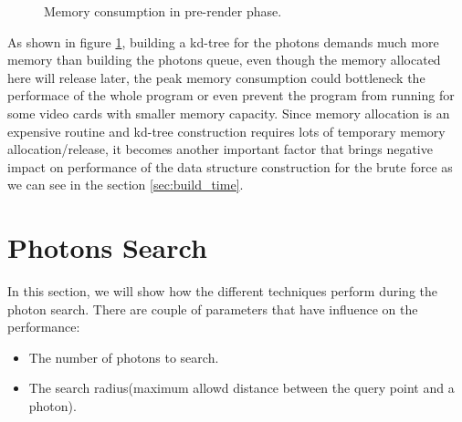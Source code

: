 \begin{figure}[ftp] 
    \centering 
    \renewcommand{\thefigure}{\thechapter.\arabic{figure}}
    \caption[]{Memory consumption in pre-render phase. }
    \label{fig:memory_consumption_2}  
\end{figure}   


As shown in figure \ref{fig:memory_consumption_2}, building a kd-tree for the photons demands much more memory than building the photons queue, even though the memory allocated here will release later, the peak memory consumption could bottleneck the performace of the whole program or even prevent the program from running for some video cards with smaller memory capacity. Since memory allocation is an expensive routine and kd-tree construction requires lots of temporary memory allocation/release, it becomes another important factor that brings negative impact on performance of the data structure construction for the brute force as we can see in the section \ref{sec:build_time}.  

\section{Photons Search}

In this section, we will show how the different techniques perform during the photon search. There are couple of parameters that have influence on the performance: 

\begin{itemize}

\item{The number of photons to search. }

\item{The search radius(maximum allowd distance between the query point and a photon). } 

\end{itemize} 

